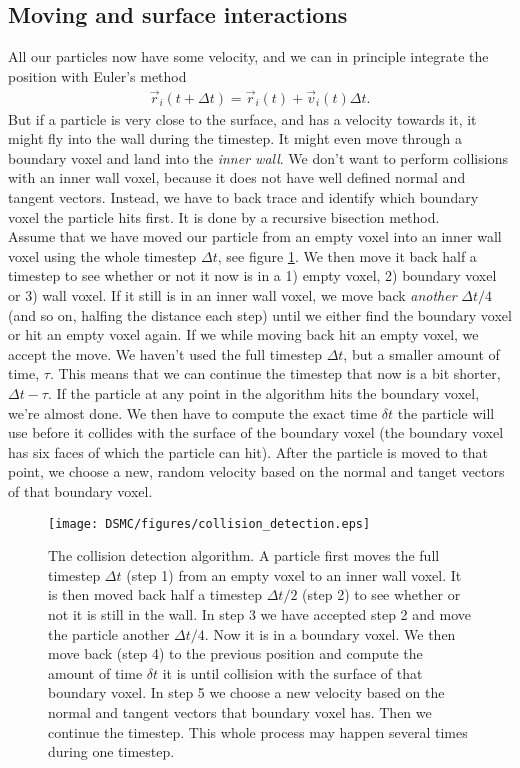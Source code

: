 \subsection{Moving and surface interactions}
All our particles now have some velocity, and we can in principle integrate the position with Euler's method
\begin{align}
	\vec r_i(t + \Delta t) = \vec r_i(t) + \vec v_i(t)\Delta t.
\end{align}
But if a particle is very close to the surface, and has a velocity towards it, it might fly into the wall during the timestep. It might even move through a boundary voxel and land into the \textit{inner wall}. We don't want to perform collisions with an inner wall voxel, because it does not have well defined normal and tangent vectors. Instead, we have to back trace and identify which boundary voxel the particle hits first. It is done by a recursive bisection method.\\
Assume that we have moved our particle from an empty voxel into an inner wall voxel using the whole timestep $\Delta t$, see figure \ref{fig:dsmc_collision_detection}. We then move it back half a timestep to see whether or not it now is in a 1) empty voxel, 2) boundary voxel or 3) wall voxel. If it still is in an inner wall voxel, we move back \textit{another} $\Delta t/4$ (and so on, halfing the distance each step) until we either find the boundary voxel or hit an empty voxel again. If we while moving back hit an empty voxel, we accept the move. We haven't used the full timestep $\Delta t$, but a smaller amount of time, $\tau$. This means that we can continue the timestep that now is a bit shorter, $\Delta t - \tau$. If the particle at any point in the algorithm hits the boundary voxel, we're almost done. We then have to compute the exact time $\delta t$ the particle will use before it collides with the surface of the boundary voxel (the boundary voxel has six faces of which the particle can hit). After the particle is moved to that point, we choose a new, random velocity based on the normal and tanget vectors of that boundary voxel.\\
\begin{figure}[h]
\begin{center}
\texttt{[image: DSMC/figures/collision\_detection.eps]}
\end{center}
\caption{The collision detection algorithm. A particle first moves the full timestep $\Delta t$ (step 1) from an empty voxel to an inner wall voxel. It is then moved back half a timestep  $\Delta t/2$ (step 2) to see whether or not it is still in the wall. In step 3 we have accepted step 2 and move the particle another $\Delta t/4$. Now it is in a boundary voxel. We then move back (step 4) to the previous position and compute the amount of time $\delta t$ it is until collision with the surface of that boundary voxel. In step 5 we choose a new velocity based on the normal and tangent vectors that boundary voxel has. Then we continue the timestep. This whole process may happen several times during one timestep.}
\label{fig:dsmc_collision_detection}
\end{figure}
